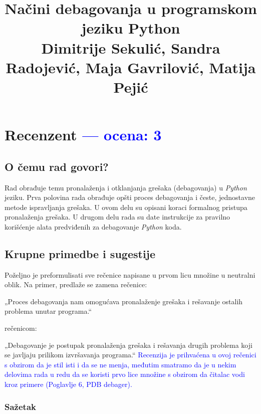 \documentclass[a4paper]{report}
\newcommand{\odgovor}[1]{\textcolor{blue}{#1}}
\begin{document}
\title{Načini debagovanja u programskom jeziku Python\\ \small{Dimitrije Sekulić, Sandra Radojević, Maja Gavrilović, Matija Pejić}}

\maketitle

\tableofcontents

\chapter{Recenzent \odgovor{--- ocena: 3} }


\section{O čemu rad govori?}
Rad obrađuje temu pronalaženja i otklanjanja grešaka (debagovanja) u \emph{Python} jeziku. Prva polovina rada obrađuje opšti proces debagovanja i česte, jednostavne metode ispravljanja grešaka. U ovom delu su opisani koraci formalnog pristupa pronalaženja grešaka. U drugom delu rada su date instrukcije za pravilno korišćenje alata predviđenih za debagovanje \emph{Python} koda.

\section{Krupne primedbe i sugestije}
Poželjno je preformulisati sve rečenice napisane u prvom licu množine u neutralni oblik.
Na primer, predlaže se zamena rečenice:

„Proces debagovanja nam omogućava pronalaženje grešaka i rešavanje ostalih problema unutar programa.“

rečenicom:

„Debagovanje je postupak pronalaženja grešaka i rešavanja drugih problema koji se javljaju prilikom izvršavanja programa.“
\odgovor{Recenzija je prihvaćena u ovoj rečenici s obzirom da je stil isti i da se ne menja, međutim smatramo da je u nekim delovima rada u redu da se koristi prvo lice množine s obzirom da čitalac vodi kroz primere (Poglavlje 6, PDB debager). }
\subsection{Sažetak}
\end{document}

